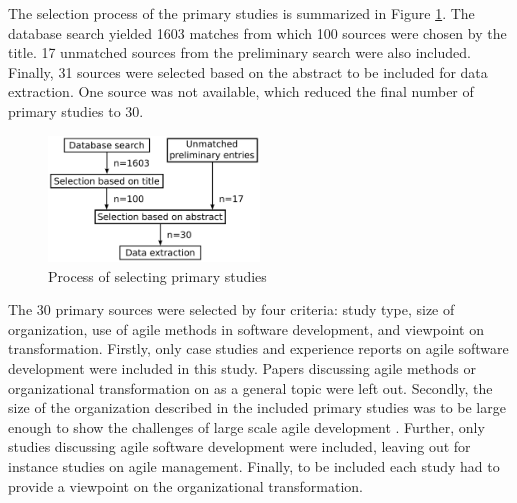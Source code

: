 \documentclass[lnbip]{svmultln}
\begin{document}
The selection process of the primary studies is summarized in Figure
\ref{fig:selection_process}. The database search yielded 1603 matches from which
100 sources were chosen by the title. 17 unmatched sources from the preliminary
search were also included. Finally, 31 sources were selected based on the
abstract to be included for data extraction. One source was not available, which
reduced the final number of primary studies to 30.

\begin{figure}[htb]
  \begin{center}
    \includegraphics[width=0.5\textwidth]{researchprocess}
    \caption{Process of selecting primary studies}
    \label{fig:selection_process}
  \end{center}
\end{figure}


The 30 primary sources were selected by four criteria: study type, size of
organization, use of agile methods in software development, and viewpoint on
transformation. Firstly, only case studies and experience reports on agile
software development were included in this study. Papers discussing agile
methods or organizational transformation on as a general topic were left out.
Secondly, the size of the organization described in the included primary studies
was to be large enough to show the challenges of large scale agile development
. Further, only studies discussing agile software development
were included, leaving out for instance studies on agile management. Finally, to
be included each study had to provide a viewpoint on the organizational
transformation.

\end{document}
